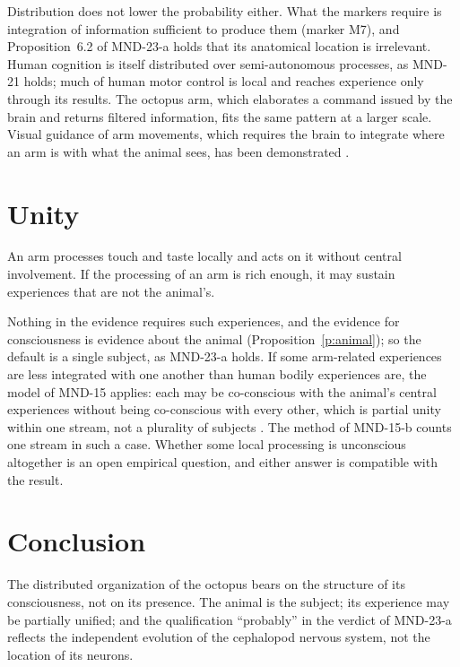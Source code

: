 \documentclass{situationist-preprint}
\begin{document}
Distribution does not lower the probability either. What the markers require is integration of information sufficient to produce them (marker M7), and Proposition~6.2 of MND-23-a holds that its anatomical location is irrelevant. Human cognition is itself distributed over semi-autonomous processes, as MND-21 holds; much of human motor control is local and reaches experience only through its results. The octopus arm, which elaborates a command issued by the brain and returns filtered information, fits the same pattern at a larger scale. Visual guidance of arm movements, which requires the brain to integrate where an arm is with what the animal sees, has been demonstrated \citep{Gutnick2011}.

\section{Unity}

\begin{objection}
An arm processes touch and taste locally and acts on it without central involvement. If the processing of an arm is rich enough, it may sustain experiences that are not the animal's.
\end{objection}

\begin{reply}
Nothing in the evidence requires such experiences, and the evidence for consciousness is evidence about the animal (Proposition~\ref{p:animal}); so the default is a single subject, as MND-23-a holds. If some arm-related experiences are less integrated with one another than human bodily experiences are, the model of MND-15 applies: each may be co-conscious with the animal's central experiences without being co-conscious with every other, which is partial unity within one stream, not a plurality of subjects \citep{CarlsDiamante2017}. The method of MND-15-b counts one stream in such a case. Whether some local processing is unconscious altogether is an open empirical question, and either answer is compatible with the result.
\end{reply}

\section{Conclusion}

The distributed organization of the octopus bears on the structure of its consciousness, not on its presence. The animal is the subject; its experience may be partially unified; and the qualification \enquote{probably} in the verdict of MND-23-a reflects the independent evolution of the cephalopod nervous system, not the location of its neurons.
\end{document}

